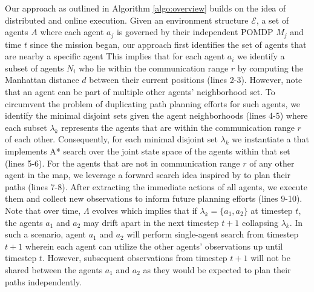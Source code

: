 \documentclass[letterpaper, 10 pt, conference]{IEEEConference}
\begin{document}
Our approach as outlined in Algorithm \ref{algo:overview} builds on the idea of distributed and online execution. Given an environment structure $\mathcal{E}$, a set of agents $A$ where each agent $a_j$ is governed by their independent POMDP $M_j$ and time $t$ since the mission began, our approach first identifies the set of agents that are nearby a specific agent This implies that for each agent $a_i$ we identify a subset of agents $N_i$ who lie within the communication range $r$ by computing the Manhattan distance $d$ between their current positions (lines 2-3). However, note that an agent can be part of multiple other agents' neighborhood set. To circumvent the problem of duplicating path planning efforts for such agents, we identify the minimal disjoint sets given the agent neighborhoods (lines 4-5) where each subset $\lambda_k$ represents the agents that are within the communication range $r$ of each other. Consequently, for each minimal disjoint set $\lambda_k$ we instantiate a  that implements A* search over the joint state space of the agents within that set (lines 5-6). For the agents that are not in communication range $r$ of any other agent in the map, we leverage a forward search idea inspired by \cite{Ayton2017RiskboundedAI} to plan their paths (lines 7-8). After extracting the immediate actions of all agents, we execute them and collect new observations to inform future planning efforts (lines 9-10). Note that over time, $\Lambda$ evolves which implies that if $\lambda_k = \{a_1, a_2\}$ at timestep $t$, the agents $a_1$ and $a_2$ may drift apart in the next timestep $t+1$ collapsing $\lambda_k$. In such a scenario, agent $a_1$ and $a_2$ will perform single-agent search from timestep $t+1$ wherein each agent can utilize the other agents' observations up until timestep $t$. However, subsequent observations from timestep $t+1$ will not be shared between the agents $a_1$ and $a_2$ as they would be expected to plan their paths independently.
\end{document}
